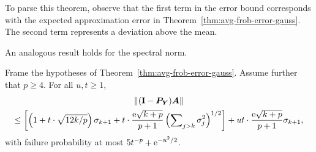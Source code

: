 \documentclass[final]{siamltex}
\newcommand{\notate}[1]{\textcolor{red}{\textbf{[#1]}}}
\begin{document}
\lsp

To parse this theorem, observe that the first term in the error bound corresponds with
the expected approximation error in Theorem~\ref{thm:avg-frob-error-gauss}.  The second
term represents a deviation above the mean.






An analogous result holds for the spectral norm.


\lsp

\begin{theorem} \label{thm:tail-spec-error-gauss}
Frame the hypotheses of Theorem~\ref{thm:avg-frob-error-gauss}.  Assume further that $p \geq 4$.
For all $u, t \geq 1$,
\begin{multline*}
\left\Vert { (\mathbf{I}- \bm{P}_{\bm{Y}}) \bm{A} } \right\Vert \\
    \leq \left[ \left( 1 + t \cdot \sqrt{12k/p} \right) \sigma_{k+1}
    + t \cdot \frac{\mathrm{e}\sqrt{k+p}}{p+1} \left( \sum\nolimits_{j>k} \sigma_j^2 \right)^{1/2} \right]
    + ut \cdot \frac{\mathrm{e}\sqrt{k+p}}{p+1} \sigma_{k+1},
\end{multline*}
with failure probability at most $5 t^{-p} + \mathrm{e}^{-u^2/2}$.
\end{theorem}
\end{document}
